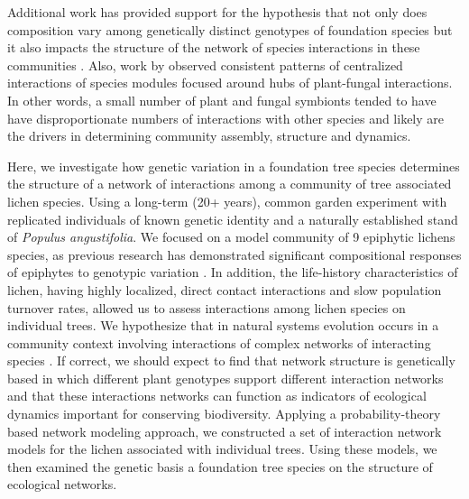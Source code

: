 \documentclass[9pt,twocolumn,twoside,lineno]{pnas-new}
\begin{document}
Additional work has provided support for the hypothesis that not only
does composition vary among genetically distinct genotypes of
foundation species but it also impacts the structure of the network of
species interactions in these communities \cite{Keith2017,
  Lau2016}. Also, work by \citep{Toju2018, Toju2015, Toju2014}
observed consistent patterns of centralized interactions of species
modules focused around hubs of plant-fungal interactions. In other
words, a small number of plant and fungal symbionts tended to have
have disproportionate numbers of interactions with other species and
likely are the drivers in determining community assembly, structure
and dynamics.

Here, we investigate how genetic variation in a foundation tree
species determines the structure of a network of interactions among a
community of tree associated lichen species. Using a long-term (20+
years), common garden experiment with replicated individuals of known
genetic identity and a naturally established stand of \textit{Populus
  angustifolia}. We focused on a model community of 9 epiphytic
lichens species, as previous research has demonstrated significant
compositional responses of epiphytes to genotypic variation
\cite{Winfree2011, Zytynska2011}. In addition, the life-history
characteristics of lichen, having highly localized, direct contact
interactions and slow population turnover rates, allowed us to assess
interactions among lichen species on individual trees. We hypothesize
that in natural systems evolution occurs in a community context
involving interactions of complex networks of interacting species
\cite{Lau2016, Keith2017, Thompson2013, Bascompte2007, Darwin1855}.
If correct, we should expect to find that network structure is
genetically based in which different plant genotypes support different
interaction networks and that these interactions networks can function
as indicators of ecological dynamics important for conserving
biodiversity.  Applying a probability-theory based network modeling
approach, we constructed a set of interaction network models for the
lichen associated with individual trees. Using these models, we then
examined the genetic basis a foundation tree species on the structure
of ecological networks.
\end{document}
